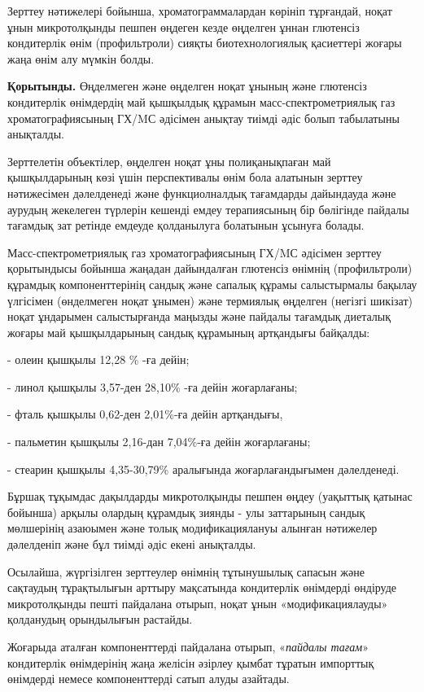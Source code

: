 Зерттеу нәтижелері бойынша, хроматограммалардан көрініп тұрғандай, ноқат
ұнын микротолқынды пешпен өңдеген кезде өңделген ұннан глютенсіз
кондитерлік өнім (профильтроли) сияқты биотехнологиялық қасиеттері
жоғары жаңа өнім алу мүмкін болды.

{\bfseries Қорытынды.} Өңделмеген және өңделген ноқат ұнының және глютенсіз
кондитерлік өнімдердің май қышқылдық құрамын масс-спектрометриялық газ
хроматографиясының ГХ/MС әдісімен анықтау тиімді әдіс болып табылатыны
анықталды.

Зерттелетін объектілер, өңделген ноқат ұны полиқанықпаған май
қышқылдарының көзі үшін перспективалы өнім бола алатынын зерттеу
нәтижесімен дәлелденеді және функциолналдық тағамдарды дайындауда және
аурудың жекелеген түрлерін кешенді емдеу терапиясының бір бөлігінде
пайдалы тағамдық зат ретінде емдеуде қолданылуга болатынын ұсынуға
болады.

Масс-спектрометриялық газ хроматографиясының ГХ/MС әдісімен зерттеу
қорытындысы бойынша жаңадан дайындалған глютенсіз өнімнің (профильтроли)
құрамдық компоненттерінің сандық және сапалық құрамы салыстырмалы
бақылау үлгісімен (өнделмеген ноқат ұнымен) және термиялық өңделген
(негізгі шикізат) ноқат ұндарымен салыстырғанда маңызды және пайдалы
тағамдық диеталық жоғары май қышқылдарының сандық құрамының артқандығы
байқалды:

- олеин қышқылы 12,28 \% -ға дейін;

- линол қышқылы 3,57-ден 28,10\% -ға дейін жоғарлағаны;

- фталь қышқылы 0,62-ден 2,01\%-ға дейін артқандығы,

- пальметин қышқылы 2,16-дан 7,04\%-ға дейін жоғарлағаны;

- стеарин қышқылы 4,35-30,79\% аралығында жоғарлағандығымен дәлелденеді.

Бұршақ тұқымдас дақылдарды микротолқынды пешпен өңдеу (уақыттық қатынас
бойынша) арқылы олардың құрамдық зиянды - улы заттарының сандық
мөлшерінің азаюымен және толық модификациялануы алынған нәтижелер
дәлелденіп және бұл тиімді әдіс екені анықталды.

Осылайша, жүргізілген зерттеулер өнімнің тұтынушылық сапасын және
сақтаудың тұрақтылығын арттыру мақсатында кондитерлік өнімдерді өндіруде
микротолқынды пешті пайдалана отырып, ноқат ұнын «модификациялауды»
қолданудың орындылығын растайды.

Жоғарыда аталған компоненттерді пайдалана отырып, «\emph{пайдалы тағам}»
кондитерлік өнімдерінің жаңа желісін әзірлеу қымбат тұратын импорттық
өнімдерді немесе компоненттерді сатып алуды азайтады.

